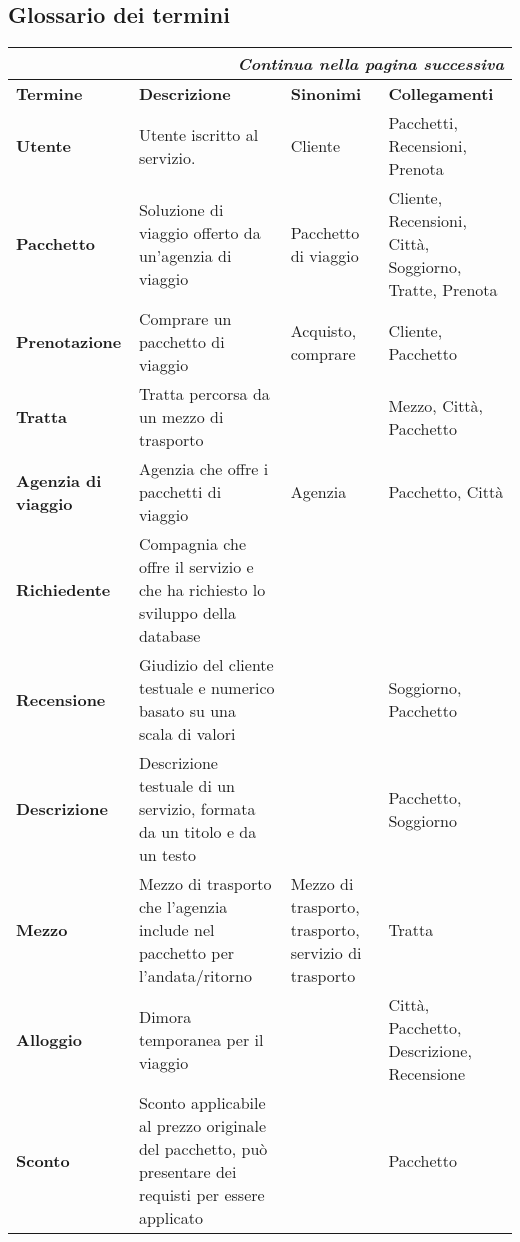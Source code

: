 \subsection{Glossario dei termini}
\begin{center}
    \begin{tabularx}{\textwidth}{p{} X p{} p{}}
        \caption{Dizionario termini}\\\toprule\endfirsthead
        \toprule\endhead
        \midrule\multicolumn{4}{r}{\itshape Continua nella pagina successiva}\\\midrule\endfoot
        \bottomrule\endlastfoot
        \textbf{Termine} & \textbf{Descrizione} & \textbf{Sinonimi} & \textbf{Collegamenti} \\
        \midrule
        \textbf{Utente} & Utente iscritto al servizio. & Cliente & Pacchetti, Recensioni, Prenota
        \\\midrule
        \textbf{Pacchetto} & Soluzione di viaggio offerto da un'agenzia di viaggio & Pacchetto di viaggio & Cliente, Recensioni, Città, Soggiorno, Tratte, Prenota
        \\\midrule
        \textbf{Prenotazione} & Comprare un pacchetto di viaggio & Acquisto, comprare & Cliente, Pacchetto
        \\\midrule
        \textbf{Tratta} & Tratta percorsa da un mezzo di trasporto & & Mezzo, Città, Pacchetto
        \\\midrule
        \textbf{Agenzia di viaggio} & Agenzia che offre i pacchetti di viaggio & Agenzia & Pacchetto, Città
        \\\midrule
        \textbf{Richiedente} & Compagnia che offre il servizio e che ha richiesto lo sviluppo della database & &
        \\\midrule
        \textbf{Recensione} & Giudizio del cliente testuale e numerico basato su una scala di valori & & Soggiorno, Pacchetto %
        \\\midrule
        \textbf{Descrizione} & Descrizione testuale di un servizio, formata da un titolo e da un testo & & Pacchetto, Soggiorno
        \\\midrule
        \textbf{Mezzo} & Mezzo di trasporto che l'agenzia include nel pacchetto per l'andata/ritorno & Mezzo di trasporto, trasporto, servizio di trasporto & Tratta
        \\\midrule
        \textbf{Alloggio} & Dimora temporanea per il viaggio & & Città, Pacchetto, Descrizione, Recensione
        \\\midrule
        \textbf{Sconto} & Sconto applicabile al prezzo originale del pacchetto, può presentare dei requisti per essere applicato & & Pacchetto
        \\
    \end{tabularx}
\end{center}

